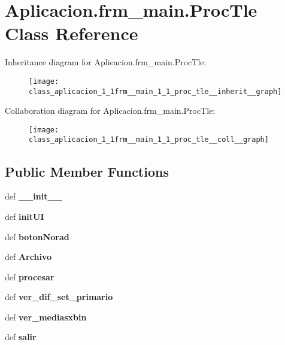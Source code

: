 \section{\-Aplicacion.\-frm\-\_\-main.\-Proc\-Tle \-Class \-Reference}
\label{class_aplicacion_1_1frm__main_1_1_proc_tle}


\-Inheritance diagram for \-Aplicacion.\-frm\-\_\-main.\-Proc\-Tle\-:\nopagebreak
\begin{figure}[H]
\begin{center}
\leavevmode
\texttt{[image: class\_aplicacion\_1\_1frm\_\_main\_1\_1\_proc\_tle\_\_inherit\_\_graph]}
\end{center}
\end{figure}


\-Collaboration diagram for \-Aplicacion.\-frm\-\_\-main.\-Proc\-Tle\-:\nopagebreak
\begin{figure}[H]
\begin{center}
\leavevmode
\texttt{[image: class\_aplicacion\_1\_1frm\_\_main\_1\_1\_proc\_tle\_\_coll\_\_graph]}
\end{center}
\end{figure}
\subsection*{\-Public \-Member \-Functions}
\begin{DoxyCompactItemize}
\item 
def {\bf \-\_\-\-\_\-init\-\_\-\-\_\-}
\item 
def {\bf init\-U\-I}
\item 
def {\bf boton\-Norad}
\item 
def {\bf \-Archivo}
\item 
def {\bf procesar}
\item 
def {\bf ver\-\_\-dif\-\_\-set\-\_\-primario}
\item 
def {\bf ver\-\_\-mediasxbin}
\item 
def {\bf salir}
\end{DoxyCompactItemize}
